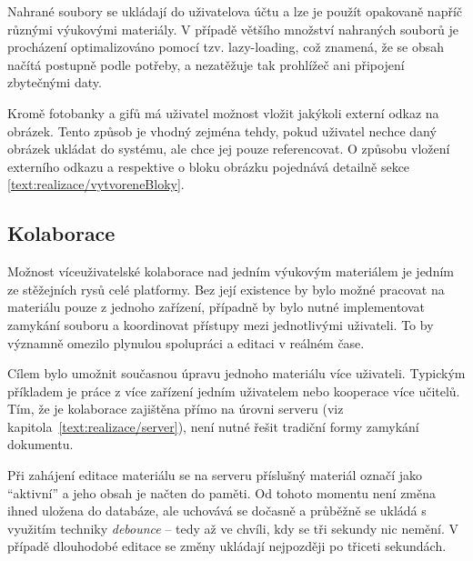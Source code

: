 Nahrané soubory se ukládají do uživatelova účtu a lze je použít opakovaně napříč různými výukovými materiály.
V případě většího množství nahraných souborů je procházení optimalizováno pomocí tzv. lazy-loading, což znamená, že se obsah načítá postupně podle potřeby, a nezatěžuje tak prohlížeč ani připojení zbytečnými daty.

Kromě fotobanky a gifů má uživatel možnost vložit jakýkoli externí odkaz na obrázek.
Tento způsob je vhodný zejména tehdy, pokud uživatel nechce daný obrázek ukládat do systému, ale chce jej pouze referencovat. 
O způsobu vložení externího odkazu a respektive o bloku obrázku pojednává detailně sekce \ref{text:realizace/vytvoreneBloky}.


\subsection{Kolaborace}

Možnost víceuživatelské kolaborace nad jedním výukovým materiálem je jedním ze stěžejních rysů celé platformy.
Bez její existence by bylo možné pracovat na materiálu pouze z jednoho zařízení, případně by bylo nutné implementovat zamykání souboru a koordinovat přístupy mezi jednotlivými uživateli. 
To by významně omezilo plynulou spolupráci a editaci v reálném čase.

Cílem bylo umožnit současnou úpravu jednoho materiálu více uživateli. 
Typickým příkladem je práce z více zařízení jedním uživatelem nebo kooperace více učitelů. 
Tím, že je kolaborace zajištěna přímo na úrovni serveru (viz kapitola~\ref{text:realizace/server}), není nutné řešit tradiční formy zamykání dokumentu.

Při zahájení editace materiálu se na serveru příslušný materiál označí jako \enquote{aktivní} a jeho obsah je načten do paměti. 
Od tohoto momentu není změna ihned uložena do databáze, ale uchovává se dočasně a průběžně se ukládá s využitím techniky \textit{debounce} -- tedy až ve chvíli, kdy se tři sekundy nic nemění. 
V případě dlouhodobé editace se změny ukládají nejpozději po třiceti sekundách.

